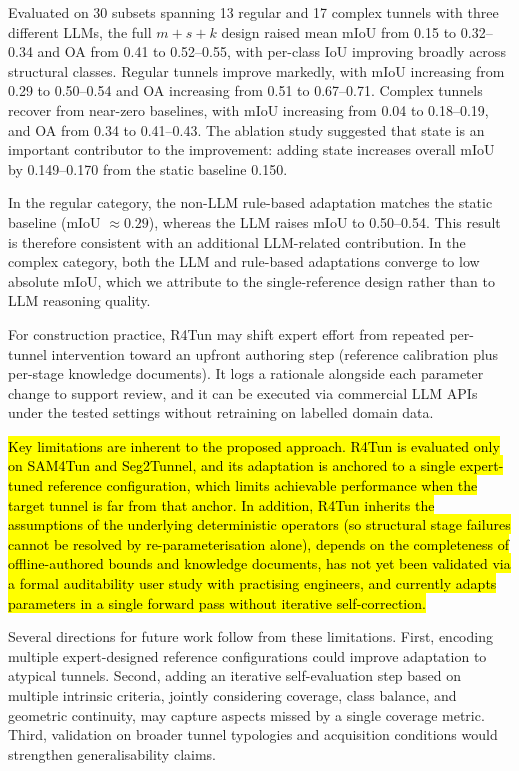 \documentclass[a4paper,fleqn]{cas-dc}
\begin{document}
{Evaluated on 30 subsets spanning 13 regular and 17 complex tunnels with three different LLMs, the full \mbox{$m+s+k$} design raised mean mIoU from 0.15 to 0.32--0.34 and OA from 0.41 to 0.52--0.55, with per-class IoU improving broadly across structural classes. Regular tunnels improve markedly, with mIoU increasing from 0.29 to 0.50--0.54 and OA increasing from 0.51 to 0.67--0.71. Complex tunnels recover from near-zero baselines, with mIoU increasing from 0.04 to 0.18--0.19, and OA from 0.34 to 0.41--0.43. The ablation study suggested that state is an important contributor to the improvement: adding state increases overall mIoU by 0.149--0.170 from the static baseline 0.150.

In the regular category, the non-LLM rule-based adaptation matches the static baseline (mIoU $\approx 0.29$), whereas the LLM raises mIoU to 0.50--0.54. This result is therefore consistent with an additional LLM-related contribution. In the complex category, both the LLM and rule-based adaptations converge to low absolute mIoU, which we attribute to the single-reference design rather than to LLM reasoning quality.

For construction practice, R4Tun may shift expert effort from repeated per-tunnel intervention toward an upfront authoring step (reference calibration plus per-stage knowledge documents). It logs a rationale alongside each parameter change to support review, and it can be executed via commercial LLM APIs under the tested settings without retraining on labelled domain data.

\hl{Key limitations are inherent to the proposed approach. R4Tun is evaluated only on SAM4Tun and Seg2Tunnel, and its adaptation is anchored to a single expert-tuned reference configuration, which limits achievable performance when the target tunnel is far from that anchor. In addition, R4Tun inherits the assumptions of the underlying deterministic operators (so structural stage failures cannot be resolved by re-parameterisation alone), depends on the completeness of offline-authored bounds and knowledge documents, has not yet been validated via a formal auditability user study with practising engineers, and currently adapts parameters in a single forward pass without iterative self-correction.}

Several directions for future work follow from these limitations. First, encoding multiple expert-designed reference configurations could improve adaptation to atypical tunnels. Second, adding an iterative self-evaluation step based on multiple intrinsic criteria, jointly considering coverage, class balance, and geometric continuity, may capture aspects missed by a single coverage metric. Third, validation on broader tunnel typologies and acquisition conditions would strengthen generalisability claims.

}
\end{document}

